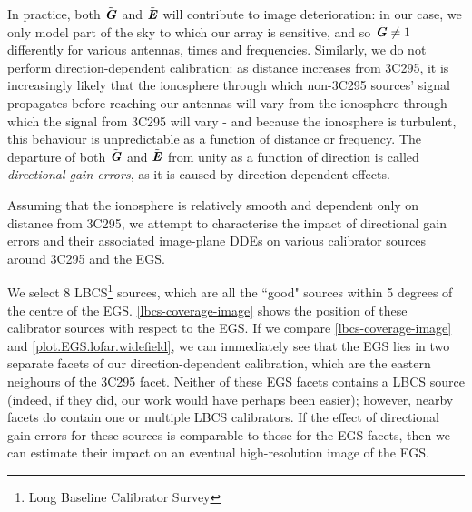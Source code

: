 \pg
In practice, both $\tilde{\textbf{\emph{G}}}$ and $\tilde{\textbf{\emph{E}}}$ will contribute to image deterioration: in our case, we only model part of the sky to which our array is sensitive, and so $\tilde{\textbf{\emph{G}}}\ne 1$ differently for various antennas, times and frequencies. Similarly, we do not perform direction-dependent calibration: as distance increases from 3C295, it is increasingly likely that the ionosphere through which non-3C295 sources' signal propagates before reaching our antennas will vary from the ionosphere through which the signal from 3C295 will vary - and because the ionosphere is turbulent, this behaviour is unpredictable as a function of distance or frequency. The departure of both $\tilde{\textbf{\emph{G}}}$ and $\tilde{\textbf{\emph{E}}}$ from unity as a function of direction is called \textit{directional gain errors}, as it is caused by direction-dependent effects. 

\pg
Assuming that the ionosphere is relatively smooth and dependent only on distance from 3C295, we attempt to characterise the impact of directional gain errors and their associated image-plane DDEs on various calibrator sources around 3C295 and the EGS. 

\pg
We select 8 LBCS\footnote{Long Baseline Calibrator Survey } sources, which are all the ``good" sources within 5 degrees of the centre of the EGS. \cref{lbcs-coverage-image} shows the position of these calibrator sources with respect to the EGS. If we compare \cref{lbcs-coverage-image} and \cref{plot.EGS.lofar.widefield}, we can immediately see that the EGS lies in two separate facets of our direction-dependent calibration, which are the eastern neighours of the 3C295 facet. Neither of these EGS facets contains a LBCS source (indeed, if they did, our work would have perhaps been easier); however, nearby facets do contain one or multiple LBCS calibrators. If the effect of directional gain errors for these sources is comparable to those for the EGS facets, then we can estimate their impact on an eventual high-resolution image of the EGS. 




